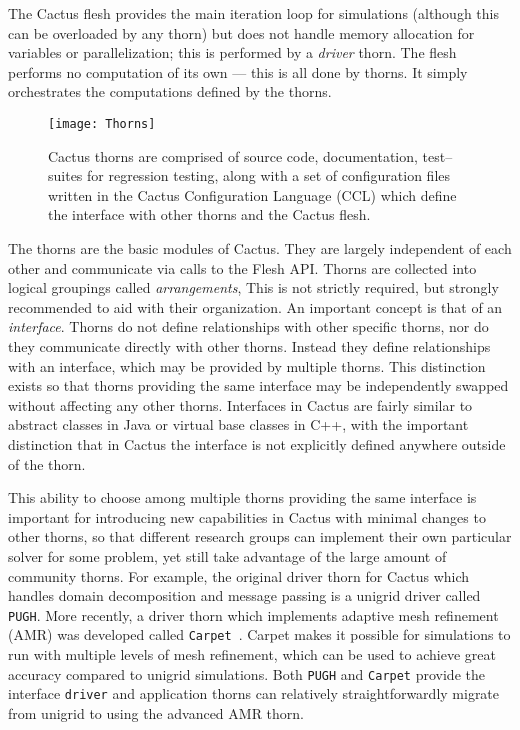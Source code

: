 \documentclass[conference]{IEEEtran}
\begin{document}
The Cactus flesh provides the main iteration loop for simulations (although
this can be overloaded by any thorn)
but does not handle 
memory allocation for variables or parallelization; this is performed by a {\it driver} thorn. 
The 
flesh performs no computation of its own --- this is all done by thorns.
It simply orchestrates the computations defined by the thorns.


\begin{figure}[t!]
\centering
\texttt{[image: Thorns]}
\label{thornfig}
\caption{Cactus thorns are comprised of source code, documentation, test--suites for regression testing, along with a set of configuration files written in the Cactus Configuration Language (CCL) which define the interface with other thorns and the Cactus flesh.}
\end{figure}


The thorns are the basic modules of Cactus. They are largely independent of each other and
communicate via calls to the Flesh API\@. Thorns are collected into logical groupings called \emph{arrangements},
This is not strictly required, but strongly recommended to aid with 
their organization. An important concept is that of an \emph{interface}.
Thorns do not
define relationships with other specific thorns, nor do they communicate directly with other thorns.
Instead they define relationships with an interface, which may be provided by multiple thorns.
This distinction exists so that thorns providing the same interface may be independently
swapped without affecting any other thorns. Interfaces in Cactus are fairly similar to
abstract classes in Java or virtual base classes in C++, with the important distinction that in Cactus
the interface is not explicitly defined anywhere outside of the thorn.


This ability to choose among multiple thorns
providing the same interface is important for introducing new capabilities 
in Cactus with minimal changes to other thorns, so that different research groups can implement their own 
particular solver for some problem, yet still take advantage of the large amount of community thorns. For example, 
the original driver thorn for Cactus which handles  domain decomposition and message passing is a unigrid 
driver called {\tt PUGH}. More recently, a driver thorn which implements adaptive mesh refinement (AMR) was developed  
called \texttt{Carpet}~\cite{Schnetter-etal-03b, Schnetter06a, ES-carpetweb}.  Carpet makes it possible for simulations to run with multiple levels of mesh refinement,
which can be used to achieve great accuracy compared to unigrid simulations. Both \texttt{PUGH} and \texttt{Carpet} 
provide the interface \texttt{driver} and application thorns can relatively straightforwardly migrate from unigrid to using the advanced AMR 
thorn. 
\end{document}
